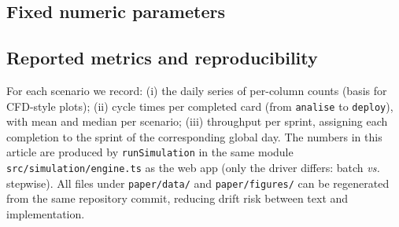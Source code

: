 \subsection{Fixed numeric parameters}
\begin{table}[htbp]
  \centering
  \caption{Global parameters used in the experiments (generated from code).}
  \label{tab:param}
  
\end{table}

\subsection{Reported metrics and reproducibility}
For each scenario we record: (i) the daily series of per-column counts (basis for CFD-style plots); (ii) cycle times per completed card (from \texttt{analise} to \texttt{deploy}), with mean and median per scenario; (iii) throughput per sprint, assigning each completion to the sprint of the corresponding global day. The numbers in this article are produced by \texttt{runSimulation} in the same module \texttt{src/simulation/engine.ts} as the web app (only the driver differs: batch \emph{vs.} stepwise). All files under \texttt{paper/data/} and \texttt{paper/figures/} can be regenerated from the same repository commit, reducing drift risk between text and implementation.
